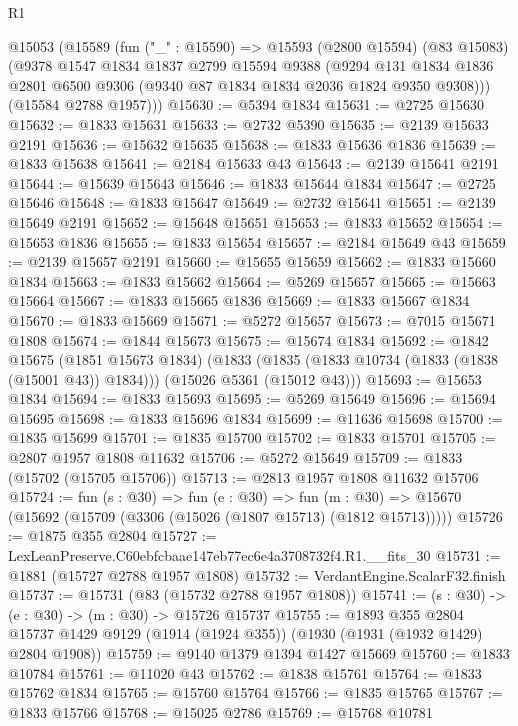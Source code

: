 \begin{lexlean}{R1}
\begin{coremodule}
  @15053
    (@15589
      (fun ("_" : @15590) =>
      @15593
        (@2800 @15594)
        (@83 @15083)
        (@9378
          @1547
          @1834
          @1837
          @2799
          @15594
          @9388
          (@9294
            @131
            @1834
            @1836
            @2801
            @6500
            @9306
            (@9340 @87 @1834 @1834 @2036 @1824 @9350 @9308)))
        (@15584 @2788 @1957)))
@15630 := @5394 @1834
@15631 := @2725 @15630
@15632 := @1833 @15631
@15633 := @2732 @5390
@15635 := @2139 @15633 @2191
@15636 := @15632 @15635
@15638 := @1833 @15636 @1836
@15639 := @1833 @15638
@15641 := @2184 @15633 @43
@15643 := @2139 @15641 @2191
@15644 := @15639 @15643
@15646 := @1833 @15644 @1834
@15647 := @2725 @15646
@15648 := @1833 @15647
@15649 := @2732 @15641
@15651 := @2139 @15649 @2191
@15652 := @15648 @15651
@15653 := @1833 @15652
@15654 := @15653 @1836
@15655 := @1833 @15654
@15657 := @2184 @15649 @43
@15659 := @2139 @15657 @2191
@15660 := @15655 @15659
@15662 := @1833 @15660 @1834
@15663 := @1833 @15662
@15664 := @5269 @15657
@15665 := @15663 @15664
@15667 := @1833 @15665 @1836
@15669 := @1833 @15667 @1834
@15670 := @1833 @15669
@15671 := @5272 @15657
@15673 := @7015 @15671 @1808
@15674 := @1844 @15673
@15675 := @15674 @1834
@15692 := @1842
    @15675
    (@1851 @15673 @1834)
    (@1833 (@1835 (@1833 @10734 (@1833 (@1838 (@15001 @43)) @1834))) (@15026 @5361 (@15012 @43)))
@15693 := @15653 @1834
@15694 := @1833 @15693
@15695 := @5269 @15649
@15696 := @15694 @15695
@15698 := @1833 @15696 @1834
@15699 := @11636 @15698
@15700 := @1835 @15699
@15701 := @1835 @15700
@15702 := @1833 @15701
@15705 := @2807 @1957 @1808 @11632
@15706 := @5272 @15649
@15709 := @1833 (@15702 (@15705 @15706))
@15713 := @2813 @1957 @1808 @11632 @15706
@15724 := fun (s : @30) =>
  fun (e : @30) =>
  fun (m : @30) => @15670 (@15692 (@15709 (@3306 (@15026 (@1807 @15713) (@1812 @15713)))))
@15726 := @1875 @355 @2804
@15727 := LexLeanPreserve.C60ebfcbaae147eb77ec6e4a3708732f4.R1.__fits_30
@15731 := @1881 (@15727 @2788 @1957 @1808)
@15732 := VerdantEngine.ScalarF32.finish
@15737 := @15731 (@83 (@15732 @2788 @1957 @1808))
@15741 := (s : @30) -> (e : @30) -> (m : @30) -> @15726 @15737
@15755 := @1893
    @355
    @2804
    @15737
    @1429
    @9129
    (@1914 (@1924 @355))
    (@1930 (@1931 (@1932 @1429) @2804 @1908))
@15759 := @9140 @1379 @1394 @1427 @15669
@15760 := @1833 @10784
@15761 := @11020 @43
@15762 := @1838 @15761
@15764 := @1833 @15762 @1834
@15765 := @15760 @15764
@15766 := @1835 @15765
@15767 := @1833 @15766
@15768 := @15025 @2786
@15769 := @15768 @10781

\end{coremodule}
\end{lexlean}
